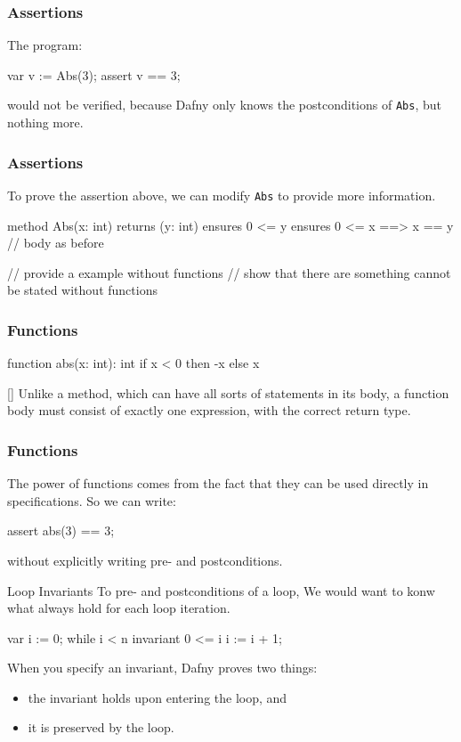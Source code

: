 \documentclass[10pt, compress]{beamer}
\begin{document}
\begin{frame}[fragile]
  \frametitle{Assertions}

  The program:
  \begin{verbnobox}[\footnotesize]
var v := Abs(3);
assert v == 3;
  \end{verbnobox}
  would not be verified, because Dafny only knows the postconditions of \verb|Abs|, but nothing more.
\end{frame}

\begin{frame}[fragile]
  \frametitle{Assertions}
  To prove the assertion above, we can modify \verb|Abs| to provide more information.
  \begin{verbnobox}[\footnotesize]
method Abs(x: int) returns (y: int)
   ensures 0 <= y
   ensures 0 <= x ==> x == y
{
   // body as before
}
  \end{verbnobox}
\end{frame}

// provide a example without functions
// show that there are something cannot be stated without functions
\begin{frame}[fragile]
  \frametitle{Functions}
  \begin{verbnobox}[\footnotesize]
function abs(x: int): int
{
   if x < 0 then -x else x
}
  \end{verbnobox}[\footnotesize]
  Unlike a method, which can have all sorts of statements in its body, a function body must consist of exactly one expression, with the correct return type.
\end{frame}

\begin{frame}[fragile]
  \frametitle{Functions}
The power of functions comes from the fact that they can be used directly in specifications. So we can write:
  \begin{verbnobox}[\footnotesize]
assert abs(3) == 3;
  \end{verbnobox}
without explicitly writing pre- and postconditions.

\end{frame}

\begin{frame}[fragile]{Loop Invariants}
To pre- and postconditions of a loop, We would want to konw what always hold for each loop iteration.
  \begin{verbnobox}[\footnotesize]
var i := 0;
while i < n
   invariant 0 <= i
{
   i := i + 1;
}
  \end{verbnobox}
When you specify an invariant, Dafny proves two things:
  \begin{itemize}
  \item the invariant holds upon entering the loop, and
  \item it is preserved by the loop.
  \end{itemize}
\end{frame}
\end{document}
